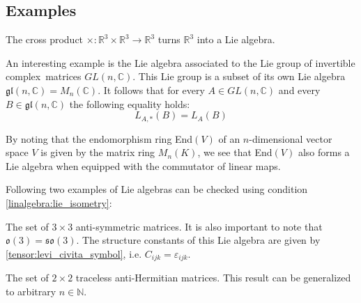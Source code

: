 
\subsection{Examples}

        \begin{example}
        	The cross product $\times:\mathbb{R}^3\times\mathbb{R}^3\rightarrow\mathbb{R}^3$ turns $\mathbb{R}^3$ into a Lie algebra.
        \end{example}
        \begin{example}
        	An interesting example is the Lie algebra associated to the Lie group of invertible complex\footnotemark\ matrices $GL(n, \mathbb{C})$. This Lie group is a subset of its own Lie algebra $\mathfrak{gl}(n, \mathbb{C}) = M_n(\mathbb{C})$. It follows that for every $A\in GL(n, \mathbb{C})$ and every $B\in\mathfrak{gl}(n, \mathbb{C})$ the following equality holds:
        	\begin{equation}
        		L_{A,\ast}(B) = L_A(B)
        	\end{equation}
        \end{example}
        \begin{result}\label{lie:end_as_lie_algebra}
        	By noting that the endomorphism ring End$(V)$ of an $n$-dimensional vector space $V$ is given by the matrix ring $M_n(K)$, we see that End$(V)$ also forms a Lie algebra when equipped with the commutator of linear maps.
        \end{result}
        
        Following two examples of Lie algebras can be checked using condition \ref{linalgebra:lie_isometry}:
        \begin{example}
        	The set of $3\times3$ anti-symmetric matrices. It is also important to note that $\mathfrak{o}(3) = \mathfrak{so}(3)$. The structure constants of this Lie algebra are given by \ref{tensor:levi_civita_symbol}, i.e. $C_{ijk} = \varepsilon_{ijk}$.
        \end{example}
        \begin{example}
        	The set of $2\times2$ traceless anti-Hermitian matrices. This result can be generalized to arbitrary $n\in\mathbb{N}$.
        \end{example}
        
